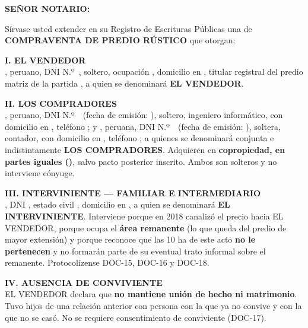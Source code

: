 \documentclass[12pt,a4paper]{article}
\begin{document}


\noindent \textbf{SEÑOR NOTARIO:}

\vspace{0.2em}
\noindent Sírvase usted extender en su Registro de Escrituras Públicas una de \textbf{COMPRAVENTA DE PREDIO RÚSTICO} que otorgan:

\vspace{0.25em}
\noindent \textbf{I. EL VENDEDOR}\\
\VendedorNombreCompleto, peruano, DNI N.º\ \VendedorDNI, soltero, ocupación \VendedorOcupacion, domicilio en \VendedorDomicilio, titular registral del predio matriz de la partida \PartidaMatriz, a quien se denominará \textbf{EL VENDEDOR}.

\vspace{0.2em}
\noindent \textbf{II. LOS COMPRADORES}\\
\textbf{\CompradorUnoNombre}, peruano, DNI N.º\ \CompradorUnoDNI\ (fecha de emisión: \CompradorUnoEmision), soltero, ingeniero informático, con domicilio en \CompradorUnoDomicilio, teléfono \CompradorUnoTelefono; y \textbf{\CompradorDosNombre}, peruana, DNI N.º\ \CompradorDosDNI\ (fecha de emisión: \CompradorDosEmision), soltera, contador, con domicilio en \CompradorDosDomicilio, teléfono \CompradorDosTelefono; a quienes se denominará conjunta e indistintamente \textbf{LOS COMPRADORES}. Adquieren en \textbf{copropiedad, en partes iguales (\PorcentajeCopropiedad)}, salvo pacto posterior inscrito. Ambos son solteros y no interviene cónyuge.

\vspace{0.2em}
\noindent \textbf{III. INTERVINIENTE --- FAMILIAR E INTERMEDIARIO}\\
\IntermediarioNombre, DNI \IntermediarioDNI, estado civil \IntermediarioEstadoCivil, domicilio en \IntermediarioDomicilio, a quien se denominará \textbf{EL INTERVINIENTE}. Interviene porque en 2018 canalizó el precio hacia EL VENDEDOR, porque ocupa el \textbf{área remanente} (lo que queda del predio de mayor extensión) y porque reconoce que las 10 ha de este acto \textbf{no le pertenecen} y no formarán parte de su eventual trato informal sobre el remanente. Protocolízense DOC-15, DOC-16 y DOC-18.

\vspace{0.15em}
\noindent \textbf{IV. AUSENCIA DE CONVIVIENTE}\\
EL VENDEDOR declara que \textbf{no mantiene unión de hecho ni matrimonio}. Tuvo hijos de una relación anterior con persona con la que ya no convive y con la que no se casó. No se requiere consentimiento de conviviente (DOC-17).
\end{document}

